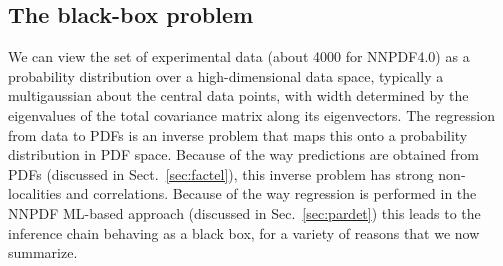 \documentclass[11pt,a4paper]{article}
\begin{document}
\subsection{The black-box problem}
\label{sec:black_box}

We can view the set of experimental data (about 4000 for NNPDF4.0) as a probability distribution over a high-dimensional data space, typically a multigaussian about the central data points, with width determined by the eigenvalues of the total covariance matrix along its eigenvectors. The regression from data to PDFs is an inverse problem that maps this onto a probability distribution in PDF space. Because of the way predictions are obtained  from PDFs (discussed in Sect.~\ref{sec:factel}), this   inverse problem 
has strong non-localities and correlations. Because  of the way regression is performed in the NNPDF ML-based approach (discussed in Sec.~\ref{sec:pardet}) this leads to the inference chain behaving as a black box, for a variety of reasons that we now summarize.
%
\end{document}
